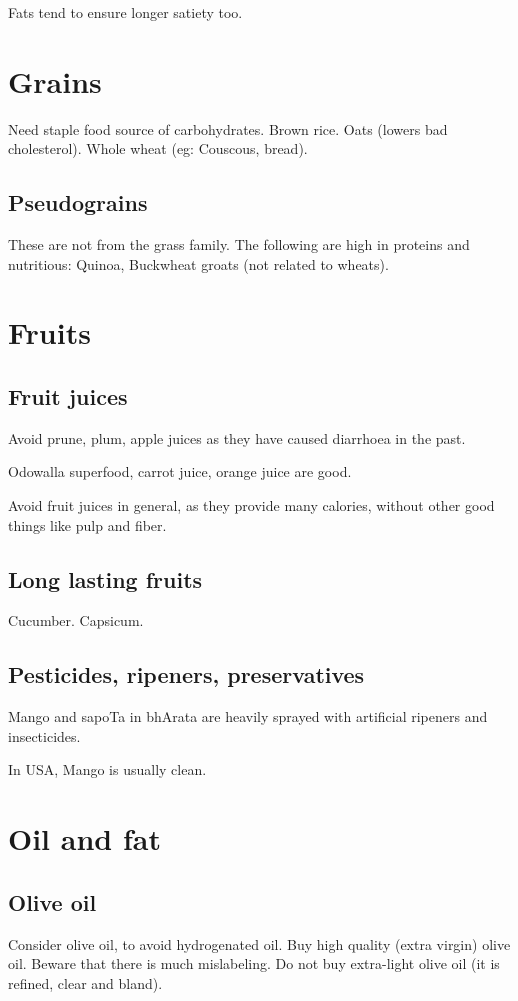 \documentclass[oneside, article]{memoir}
\begin{document}
Fats tend to ensure longer satiety too.

\section{Grains}
Need staple food source of carbohydrates. Brown rice. Oats (lowers bad cholesterol). Whole wheat (eg: Couscous, bread).

\subsection{Pseudograins}
These are not from the grass family. The following are high in proteins and nutritious: Quinoa, Buckwheat groats (not related to wheats). 

\section{Fruits}
\subsection{Fruit juices}
Avoid prune, plum, apple juices as they have caused diarrhoea in the past.

Odowalla superfood, carrot juice, orange juice are good.

Avoid fruit juices in general, as they provide many calories, without other good things like pulp and fiber.

\subsection{Long lasting fruits}
Cucumber. Capsicum.

\subsection{Pesticides, ripeners, preservatives}
Mango and sapoTa in bhArata are heavily sprayed with artificial ripeners and insecticides.

In USA, Mango is usually clean.

\section{Oil and fat}
\subsection{Olive oil}
Consider olive oil, to avoid hydrogenated oil. Buy high quality (extra virgin) olive oil. Beware that there is much mislabeling. Do not buy extra-light olive oil (it is refined, clear and bland).
\end{document}
